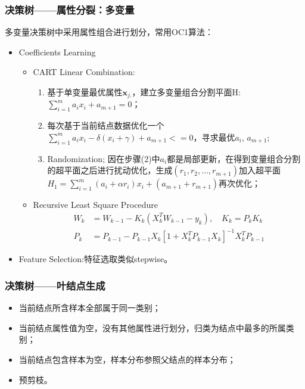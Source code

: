 \documentclass[usenames,dvipsnames]{beamer}
\begin{document}
\begin{frame}
\frametitle{决策树——属性分裂：多变量}
多变量决策树中采用属性组合进行划分，常用OC1算法：
\begin{itemize}

  \item Coefficients Learning\par
    \begin{itemize}
      \item CART Linear Combination:
        \begin{enumerate}
          \item 基于单变量最优属性$\textbf{x}_{j.}$，建立多变量组合分割平面H:$\sum_{i=1}^{m}a_ix_i+a_{m+1}=0$；
          \item 每次基于当前结点数据优化一个$\sum_{i=1}^{m}a_ix_i-\delta(x_i+\gamma)+a_{m+1}<=0$，寻求最优$a_i,\,a_{m+1}$;
          \item Randomization; 因在步骤(2)中$a_i$都是局部更新，在得到变量组合分割的超平面之后进行扰动优化，生成$(r_1,r_2,\dots, r_{m+1})$加入超平面$H_1 = \sum_{i=1}^{m}(a_i+\alpha r_i)x_i+(a_{m+1}+r_{m+1})$再次优化；
        \end{enumerate}
      \item Recursive Least Square Procedure
        \begin{align*}
          W_k &= W_{k-1}-K_k(X_k^TW_{k-1}-y_k),\quad K_k = P_kK_k\\
          P_k &= P_{k-1} - P_{k-1}X_k[1+X_k^TP_{k-1}X_k]^{-1}X_k^TP_{k-1}
        \end{align*}
    \end{itemize}

  \item Feature Selection:\quad 特征选取类似stepwise。
\end{itemize}
\end{frame}
\begin{frame}
\frametitle{决策树——叶结点生成}
\vskip 0.5cm
\begin{itemize}
  \item 当前结点所含样本全部属于同一类别；\vskip 0.36cm


  \item 当前结点属性值为空，没有其他属性进行划分，归类为结点中最多的所属类别；\vskip 0.36cm


  \item 当前结点包含样本为空，样本分布参照父结点的样本分布；\vskip 0.36cm

  \item 预剪枝。
\end{itemize}
\vskip 0.5cm
\end{frame}
\end{document}
